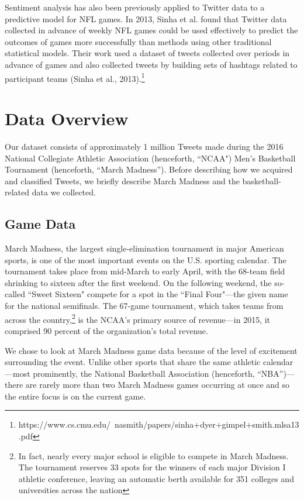 \documentclass[12pt]{article}
\begin{document}
\begin{doublespacing}
Sentiment analysis has also been previously applied
to Twitter data to a predictive model for NFL games. 
In 2013, Sinha et al. found that Twitter data collected
in advance of weekly NFL games could be used effectively
to predict the outcomes of games more successfully than
methods using other traditional statistical models. Their
work used a dataset of tweets collected over periods 
in advance of games and also collected tweets by 
building sets of hashtags related to participant teams (Sinha et al., 2013).\footnote{https://www.cs.cmu.edu/~nasmith/papers/sinha+dyer+gimpel+smith.mlsa13.pdf}

\section{Data Overview}

Our dataset consists of approximately 1 million Tweets made during the 2016 National Collegiate Athletic Association (henceforth, ``NCAA") Men's Basketball Tournament (henceforth, ``March Madness''). Before describing how we acquired and classified Tweets, we briefly describe March Madness and the basketball-related data we collected. 

\subsection{Game Data}

March Madness, the largest single-elimination tournament in major American sports, is one of the most important events on the U.S. sporting calendar. The tournament takes place from mid-March to early April, with the 68-team field shrinking to sixteen after the first weekend. On the following weekend, the so-called ``Sweet Sixteen" compete for a spot in the ``Final Four"---the given name for the national semifinals. The 67-game tournament, which takes teams from across the country,\footnote{In fact, nearly every major school is eligible to compete in March Madness. The tournament reserves 33 spots for the winners of each major Division I athletic conference, leaving an automatic berth available for 351 colleges and universities across the nation} is the NCAA's primary source of revenue---in 2015, it comprised 90 percent of the organization's total revenue. 

We chose to look at March Madness game data because of the level of excitement surrounding the event. Unlike other sports that share the same athletic calendar---most prominently, the National Basketball Association (henceforth, ``NBA'')---there are rarely more than two March Madness games occurring at once and so the entire focus is on the current game. 


\end{doublespacing}
\end{document}
